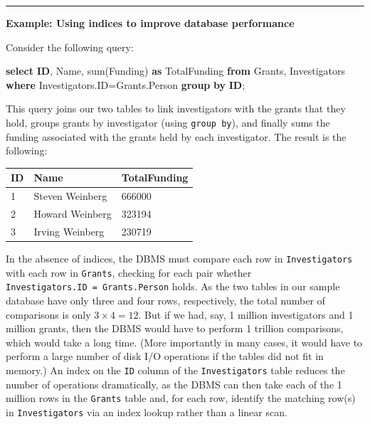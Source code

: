 \documentclass[]{krantz}
\newenvironment{Shaded}{\begin{snugshade}}{\end{snugshade}}
\newcommand{\KeywordTok}[1]{\textcolor[rgb]{0.13,0.29,0.53}{\textbf{#1}}}
\newcommand{\FunctionTok}[1]{\textcolor[rgb]{0.00,0.00,0.00}{#1}}
\newcommand{\NormalTok}[1]{#1}
\begin{document}
\begin{center}\rule{0.5\linewidth}{\linethickness}\end{center}

\textbf{Example: Using indices to improve database performance}

Consider the following query:

\begin{Shaded}
\begin{Highlighting}[]
\KeywordTok{select} \KeywordTok{ID}\NormalTok{, Name, }\FunctionTok{sum}\NormalTok{(Funding) }\KeywordTok{as}\NormalTok{ TotalFunding}
  \KeywordTok{from}\NormalTok{ Grants, Investigators}
    \KeywordTok{where}\NormalTok{ Investigators.ID=Grants.Person}
  \KeywordTok{group} \KeywordTok{by} \KeywordTok{ID}\NormalTok{;}
\end{Highlighting}
\end{Shaded}

This query joins our two tables to link investigators with the grants
that they hold, groups grants by investigator (using
\texttt{group\ by}), and finally sums the funding associated with the
grants held by each investigator. The result is the following:

\begin{longtable}[]{@{}lll@{}}
\toprule
\textbf{ID} & \textbf{Name} & \textbf{TotalFunding}\tabularnewline
\midrule
\endhead
1 & Steven Weinberg & 666000\tabularnewline
2 & Howard Weinberg & 323194\tabularnewline
3 & Irving Weinberg & 230719\tabularnewline
\bottomrule
\end{longtable}

In the absence of indices, the DBMS must compare each row in
\texttt{Investigators} with each row in \texttt{Grants}, checking for
each pair whether \texttt{Investigators.ID\ =\ Grants.Person} holds. As
the two tables in our sample database have only three and four rows,
respectively, the total number of comparisons is only \(3\times 4=12\).
But if we had, say, 1 million investigators and 1 million grants, then
the DBMS would have to perform 1 trillion comparisons, which would take
a long time. (More importantly in many cases, it would have to perform a
large number of disk I/O operations if the tables did not fit in
memory.) An index on the \texttt{ID} column of the
\texttt{Investigators} table reduces the number of operations
dramatically, as the DBMS can then take each of the 1 million rows in
the \texttt{Grants} table and, for each row, identify the matching
row(s) in \texttt{Investigators} via an index lookup rather than a
linear scan.
\end{document}
